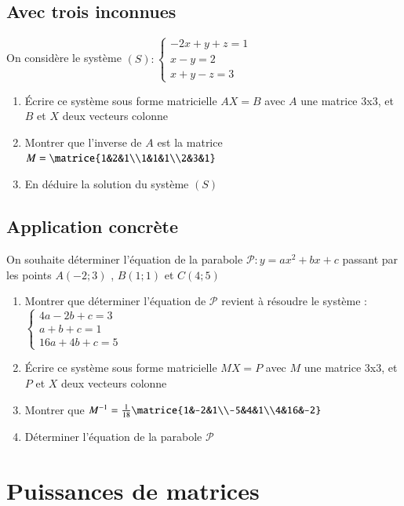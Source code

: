 \documentclass[oneside,12pt]{article}          %
\begin{document}
\subsection{Avec trois inconnues}
On considère le système $(S):\begin{cases}-2x+y+z=1\\x-y=2\\x+y-z=3\end{cases}$
    \begin{enumerate}
        \item Écrire ce système sous forme matricielle $AX=B$ avec $A$ une matrice 3x3, et $B$ et $X$ deux vecteurs colonne
        \item Montrer que l'inverse de $A$ est la matrice $M=\matrice{1&2&1\\1&1&1\\2&3&1}$
        \item En déduire la solution du système $(S)$
    \end{enumerate}


\subsection{Application concrète}
On souhaite déterminer l'équation de la parabole $\mathscr{P}:y=ax^2+bx+c$ passant par les points $A(-2;3)$ , $B(1;1)$ et $C(4;5)$
    \begin{enumerate}
        \item Montrer que déterminer l'équation de $\mathscr{P}$ revient à résoudre le système : $\begin{cases}4a-2b+c=3\\a+b+c=1\\16a+4b+c=5\end{cases}$
        \item Écrire ce système sous forme matricielle $MX=P$ avec $M$ une matrice 3x3, et $P$ et $X$ deux vecteurs colonne
        \item Montrer que $M^{-1}=\frac{1}{18}\matrice{1&-2&1\\-5&4&1\\4&16&-2} $
        \item Déterminer l'équation de la parabole $\mathscr{P}$
    \end{enumerate}




\section{Puissances de matrices}
\end{document}
